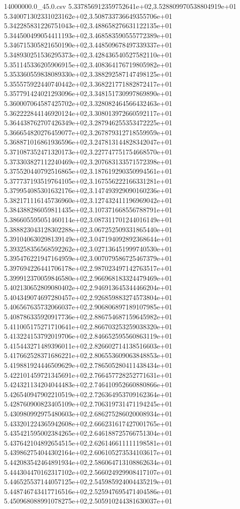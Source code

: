 \begin{filecontents*}{14000000.0_45.0.csv}
5.337856912359752641e+02,3.528809970538804919e+01
5.340071302331023162e+02,3.508733736649355706e+01
5.342285831226751043e+02,3.488658276631122135e+01
5.344500499054411193e+02,3.468583590555772389e+01
5.346715305821650190e+02,3.448509678497339337e+01
5.348930251536295373e+02,3.428436540527582110e+01
5.351145336205906915e+02,3.408364176719805982e+01
5.353360559838089330e+02,3.388292587147498125e+01
5.355575922440740442e+02,3.368221771882872417e+01
5.357791424021293096e+02,3.348151730997869890e+01
5.360007064587425702e+02,3.328082464566432463e+01
5.362222844146920124e+02,3.308013972660592117e+01
5.364438762707426349e+02,3.287946255353472225e+01
5.366654820276459077e+02,3.267879312718559959e+01
5.368871016861936596e+02,3.247813144828342047e+01
5.371087352471320173e+02,3.227747751754668570e+01
5.373303827112240469e+02,3.207683133571572398e+01
5.375520440792516865e+02,3.187619290350994561e+01
5.377737193519764105e+02,3.167556222166331281e+01
5.379954085301632176e+02,3.147493929090160236e+01
5.382171116145736960e+02,3.127432411196969042e+01
5.384388286059811435e+02,3.107371668556788791e+01
5.386605595051460114e+02,3.087311701244016149e+01
5.388823043128302288e+02,3.067252509331865440e+01
5.391040630298139149e+02,3.047194092892368644e+01
5.393258356568592262e+02,3.027136451999740530e+01
5.395476221947164959e+02,3.007079586725467379e+01
5.397694226441706178e+02,2.987023497142763517e+01
5.399912370059846580e+02,2.966968183324479469e+01
5.402130652809080402e+02,2.946913645344466204e+01
5.404349074697280457e+02,2.926859883274573804e+01
5.406567635732066037e+02,2.906806897189107985e+01
5.408786335920917736e+02,2.886754687159645982e+01
5.411005175271710641e+02,2.866703253259038320e+01
5.413224153792019706e+02,2.846652595560863119e+01
5.415443271489396011e+02,2.826602714138516603e+01
5.417662528371686221e+02,2.806553609063848853e+01
5.419881924446509629e+02,2.786505280411438434e+01
5.422101459721345691e+02,2.766457728252771631e+01
5.424321134204044483e+02,2.746410952660880866e+01
5.426540947902210519e+02,2.726364953709162364e+01
5.428760900823405109e+02,2.706319731471194245e+01
5.430980992975480603e+02,2.686275286020008934e+01
5.433201224365942608e+02,2.666231617427001765e+01
5.435421595002384265e+02,2.646188725766751304e+01
5.437642104892654515e+02,2.626146611111198581e+01
5.439862754044302164e+02,2.606105273534103617e+01
5.442083542464891934e+02,2.586064713108862634e+01
5.444304470162317102e+02,2.566024929908417107e+01
5.446525537144057125e+02,2.545985924004435219e+01
5.448746743417716516e+02,2.525947695471404586e+01
5.450968088991078275e+02,2.505910244381630037e+01

\end{filecontents*}
